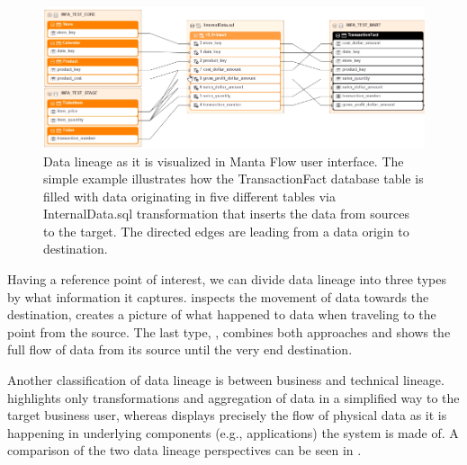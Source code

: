 \begin{figure}[H]
	\centering
	\includegraphics[width=14cm]{../img/DataLineageExample}
	\caption[Data Lineage Visualization]{Data lineage as it is visualized in Manta Flow user interface. The simple example illustrates how the TransactionFact database table is filled with data originating in five different tables via InternalData.sql transformation that inserts the data from sources to the target. The directed edges are leading from a data origin to destination.\cite{MantaExample}}
	\label{LineageGraph}
\end{figure}

Having a reference point of interest, we can divide data lineage into three types by what information it captures.  inspects the movement of data towards the destination,  creates a picture of what happened to data when traveling to the point from the source. The last type, , combines both approaches and shows the full flow of data from its source until the very end destination.

Another classification of data lineage is between business and technical lineage.
 highlights only transformations and aggregation of data in a simplified way to the target business user, whereas  displays precisely the flow of physical data as it is happening in underlying components (e.g., applications) the system is made of. A comparison of the two data lineage perspectives can be seen in .

